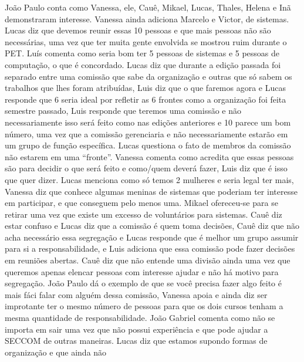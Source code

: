 \documentclass{ata-calico}
\begin{document}
\maketitle


João Paulo conta como Vanessa, ele, Cauê, Mikael, Lucas, Thales, Helena e Inã
demonstraram interesse. Vanessa ainda adiciona Marcelo e Victor, de sistemas.
Lucas diz que devemos reunir essas 10 pessoas e que mais pessoas não são
necessárias, uma vez que ter muita gente envolvida se mostrou ruim durante o
PET\@. Luís comenta como seria bom ter 5 pessoas de sistemas e 5 pessoas de
computação, o que é concordado. Lucas diz que durante a edição passada foi
separado entre uma comissão que sabe da organização e outras que só sabem os
trabalhos que lhes foram atribuídas, Luis diz que o que faremos agora e Lucas
responde que 6 seria ideal por refletir as 6 frontes como a organização foi
feita semestre passado, Luis responde que teremos uma comissão e não
necessariamente isso será feito como nas edições anteriores e 10 parece um bom
número, uma vez que a comissão gerenciaria e não necessariamente estarão em um
grupo de função específica.  Lucas questiona o fato de membros da comissão não
estarem em uma ``fronte''.  Vanessa comenta como acredita que essas pessoas são
para decidir o que será feito e como/quem deverá fazer, Luis diz que é isso que
quer dizer. Lucas menciona como só temos 2 mulheres e seria legal ter mais,
Vanessa diz que conhece algumas meninas de sistemas que poderiam ter interesse
em participar, e que conseguem pelo menos uma. Mikael ofereceu-se para se
retirar uma vez que existe um excesso de voluntários para sistemas. Cauê diz
estar confuso e Lucas diz que a comissão é quem toma decisões, Cauê diz que não
acha necessário essa segregação e Lucas responde que é melhor um grupo assumir
para si a responsabilidade, e Luis adiciona que essa comissão pode fazer
decisões em reuniões abertas. Cauê diz que não entende uma divisão ainda uma
vez que queremos apenas elencar pessoas com interesse ajudar e não há motivo
para segregação. João Paulo dá o exemplo de que se você precisa fazer algo
feito é mais fáci falar com alguém dessa comissão, Vanessa apoia e ainda diz
ser improtante ter o mesmo número de pessoas para que os dois cursos tenham a
mesma quantidade de responsabilidade. João Gabriel comenta como não se importa
em sair uma vez que não possui experiência e que pode ajudar a SECCOM de outras
maneiras. Lucas diz que estamos supondo formas de organização e que ainda não
\end{document}
